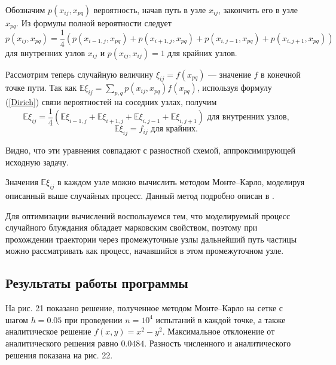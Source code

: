 \documentclass[16pt]{article}
\begin{document}
Обозначим $p(x_{ij}, x_{pq})$ вероятность, начав путь в узле $x_{ij}$, закончить его в узле $x_{pq}$. Из формулы полной вероятности следует
\begin{equation}\label{Dirich}
p(x_{ij}, x_{pq}) = \dfrac14(p(x_{i-1,j}, x_{pq}) + p(x_{i+1, j}, x_{pq}) + p(x_{i, j-1}, x_{pq}) + p(x_{i,j+1}, x_{pq}))
\end{equation}
для внутренних узлов $x_{ij}$ и $p(x_{ij}, x_{ij}) = 1$ для крайних узлов.

Рассмотрим теперь случайную величину $\xi_{ij} = f(x_{pq})$ --- значение $f$ в конечной точке пути.
Так как $\mathbb{E}\xi_{ij} = \sum_{p, q}p(x_{ij}, x_{pq})f(x_{pq})$, используя формулу (\ref{Dirich}) связи вероятностей на соседних узлах, получим
$$\mathbb{E}\xi_{ij} = \dfrac14(\mathbb{E}\xi_{i-1,j} + \mathbb{E}\xi_{i+1, j} + \mathbb{E}\xi_{i, j-1} + \mathbb{E}\xi_{i,j+1}) \text{ для внутренних узлов,}$$
$$\mathbb{E}\xi_{ij} = f_{ij} \text{ для крайних}.$$

Видно, что эти уравнения совпадают с разностной схемой, аппроксимирующей исходную задачу.

Значения $\mathbb{E}\xi_{ij}$ в каждом узле можно вычислить методом Монте--Карло, моделируя описанный выше случайных процесс. Данный метод подробно описан в \cite{Buslenko}.

Для оптимизации вычислений воспользуемся тем, что моделируемый процесс случайного блуждания обладает марковским свойством, поэтому при прохождении траектории через промежуточные узлы дальнейший путь частицы можно рассматривать как процесс, начавшийся в этом промежуточном узле.

\subsection{Результаты работы программы}

На рис. 21 показано решение, полученное методом Монте--Карло на сетке с шагом $h = 0.05$ при проведении $n = 10^4$ испытаний в каждой точке, а также аналитическое решение $f(x, y) = x^2 - y^2$. Максимальное отклонение от аналитического решения равно $0.0484$. Разность численного и аналитического решения показана на рис. 22.
\end{document}
